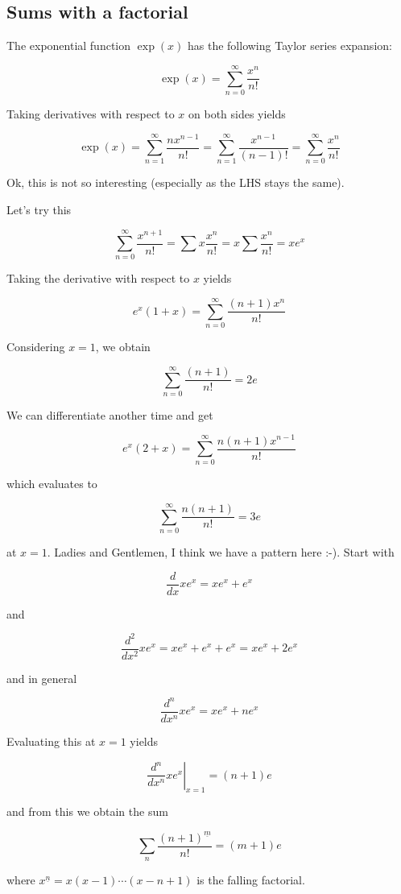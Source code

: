 
\subsection{Sums with a factorial}

The exponential function \(\exp(x)\) has the following Taylor series
expansion:

\[
\exp(x) = \sum_{n=0}^\infty \frac{x^n}{n!}
\]

Taking derivatives with respect to \(x\) on both sides yields

\[
\exp(x) = \sum_{n=1}^\infty \frac{n x^{n-1}}{n!} = \sum_{n=1}^\infty \frac{x^{n-1}}{(n-1)!} = \sum_{n=0}^\infty \frac{x^n}{n!}
\]

Ok, this is not so interesting (especially as the LHS stays the same).

Let's try this

\[
\sum_{n=0}^\infty \frac{x^{n+1}}{n!} = \sum x \frac{x^n}{n!} = x \sum \frac{x^n}{n!} = x e^x
\]

Taking the derivative with respect to \(x\) yields

\[
e^x (1+x) = \sum_{n=0}^\infty \frac{(n+1)x^n}{n!}
\]

Considering \(x=1\), we obtain

\[
\sum_{n=0}^\infty \frac{(n+1)}{n!} = 2e
\]

We can differentiate another time and get

\[
e^x (2+x) = \sum_{n=0}^\infty \frac{n(n+1)x^{n-1}}{n!}
\]

which evaluates to

\[
\sum_{n=0}^\infty \frac{n(n+1)}{n!} = 3e
\]

at \(x=1\). Ladies and Gentlemen, I think we have a pattern here :-).
Start with

\[
\frac{d}{dx}xe^x = xe^x + e^x
\]

and

\[
\frac{d^2}{dx^2}xe^x = xe^x + e^x + e^x = xe^x + 2e^x
\]

and in general

\[
\frac{d^n}{dx^n}x e^x = xe^x + ne^x
\]

Evaluating this at \(x=1\) yields

\[
\left. \frac{d^n}{dx^n}x e^x \right|_{x=1} = (n+1)e
\]

and from this we obtain the sum

\[
\sum_{n} \frac{(n+1)^{\underline{m}}}{n!} = (m+1)e
\]

where \(x^{\underline{n}} = x(x-1)\cdots(x-n+1)\) is the falling
factorial.
